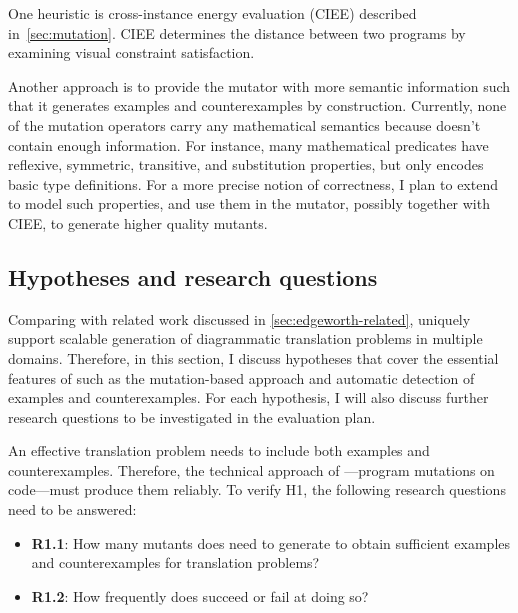 One heuristic is cross-instance energy evaluation (CIEE) described in~\cref{sec:mutation}.  CIEE determines the distance between two \Substance programs by examining visual constraint satisfaction. 

Another approach is to provide the \Edgeworth mutator with more semantic information such that it generates examples and counterexamples by construction. Currently, none of the mutation operators carry any mathematical semantics because \Domain doesn't contain enough information. For instance, many mathematical predicates have reflexive, symmetric, transitive, and substitution properties, but \Domain only encodes basic type definitions. For a more precise notion of correctness, I plan to extend \Domain to model such properties, and use them in the \Edgeworth mutator, possibly together with CIEE, to generate higher quality mutants.  

\subsection{Hypotheses and research questions}

Comparing with related work discussed in \cref{sec:edgeworth-related}, \Edgeworth uniquely support scalable generation of diagrammatic translation problems in multiple domains. Therefore, in this section, I discuss hypotheses that cover the essential features of \Edgeworth such as the mutation-based approach and automatic detection of examples and counterexamples. For each hypothesis, I will also discuss further research questions to be investigated in the evaluation plan. 


An effective translation problem needs to include both examples and counterexamples. Therefore, the technical approach of \Edgeworth---program mutations on \Substance code---must produce them reliably. To verify H1, the following research questions need to be answered:

\begin{itemize}
    \item \textbf{R1.1}: How many mutants does \Edgeworth need to generate to obtain sufficient examples and counterexamples for translation problems?
    \item \textbf{R1.2}: How frequently does \Edgeworth succeed or fail at doing so?
\end{itemize}


